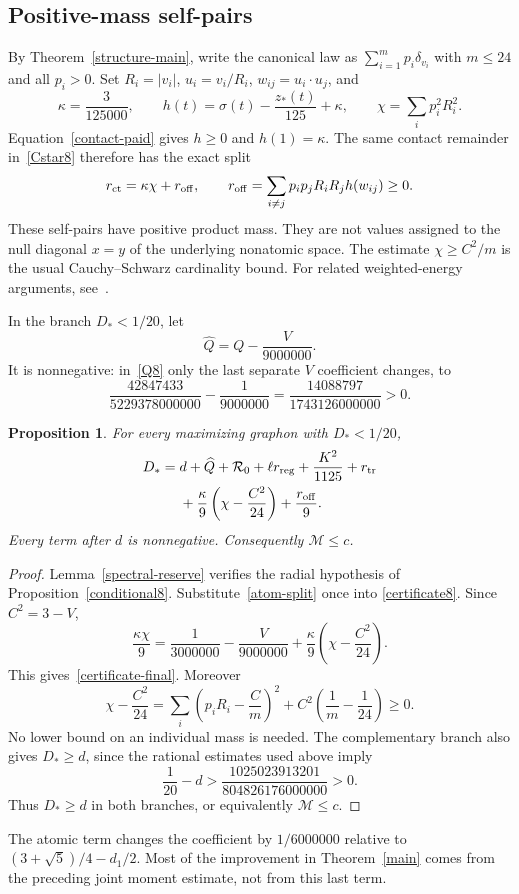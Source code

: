 \documentclass[11pt]{article}
\newtheorem{proposition}[theorem]{Proposition}
\theoremstyle{remark}\newtheorem{remark}[theorem]{Remark}
\numberwithin{equation}{section}
\begin{document}
\subsection{Positive-mass self-pairs}
By Theorem~\ref{structure-main}, write the canonical law as
$\sum_{i=1}^m p_i\delta_{v_i}$ with $m\le24$ and all $p_i>0$.
Set $R_i=|v_i|$, $u_i=v_i/R_i$, $w_{ij}=u_i\cdot u_j$, and
\[
 \kappa=\frac3{125000},\qquad
 h(t)=\sigma(t)-\frac{z_*(t)}{125}+\kappa,
 \qquad \chi=\sum_i p_i^2R_i^2.
\]
Equation~\eqref{contact-paid} gives $h\ge0$ and $h(1)=\kappa$.
The same contact remainder in~\eqref{Cstar8} therefore has the exact split
\begin{equation}\label{atom-split}
 r_{\rm ct}=\kappa\chi+r_{\rm off},\qquad
 r_{\rm off}=\sum_{i\ne j}p_ip_jR_iR_jh(w_{ij})\ge0.
\end{equation}
These self-pairs have positive product mass. They are not values assigned
to the null diagonal $x=y$ of the underlying nonatomic space.
The estimate $\chi\ge C^2/m$ is the usual Cauchy--Schwarz
cardinality bound. For related weighted-energy arguments,
see~\cite[Theorem 2.1 and the subsequent discussion]{Weighted}.

In the branch $D_*<1/20$, let
\[
 \widehat Q=Q-\frac{V}{9000000}.
\]
It is nonnegative: in~\eqref{Q8} only the last separate $V$ coefficient
changes, to
\[
 \frac{42847433}{5229378000000}-\frac1{9000000}
       =\frac{14088797}{1743126000000}>0.
\]
\begin{proposition}\label{final-certificate}
For every maximizing graphon with $D_*<1/20$,
\begin{align}\label{certificate-final}
 D_*={}&d+\widehat Q+{\cal R}_0+\ell r_{\rm reg}
       +\frac{K^2}{1125}+r_{\rm tr}\notag\\
 &+\frac{\kappa}{9}\left(\chi-\frac{C^2}{24}\right)
       +\frac{r_{\rm off}}9.
\end{align}
Every term after $d$ is nonnegative. Consequently $\mathcal M\le c$.
\end{proposition}
\begin{proof}
Lemma~\ref{spectral-reserve} verifies the radial hypothesis of
Proposition~\ref{conditional8}. Substitute~\eqref{atom-split} once into
\eqref{certificate8}. Since $C^2=3-V$,
\[
 \frac{\kappa\chi}{9}
 =\frac1{3000000}-\frac{V}{9000000}
       +\frac{\kappa}{9}\left(\chi-\frac{C^2}{24}\right).
\]
This gives~\eqref{certificate-final}. Moreover
\[
 \chi-\frac{C^2}{24}
 =\sum_i\left(p_iR_i-\frac Cm\right)^2
       +C^2\left(\frac1m-\frac1{24}\right)\ge0.
\]
No lower bound on an individual mass is needed. The complementary branch
also gives $D_*\ge d$, since the rational estimates used above imply
\[
 \frac1{20}-d>
       \frac{1025023913201}{804826176000000}>0.
\]
Thus $D_*\ge d$ in both branches, or equivalently $\mathcal M\le c$.
\end{proof}
The atomic term changes the coefficient by $1/6000000$ relative to
$(3+\sqrt5)/4-d_1/2$. Most of the improvement in Theorem~\ref{main}
comes from the preceding joint moment estimate, not from this last term.
\end{document}
